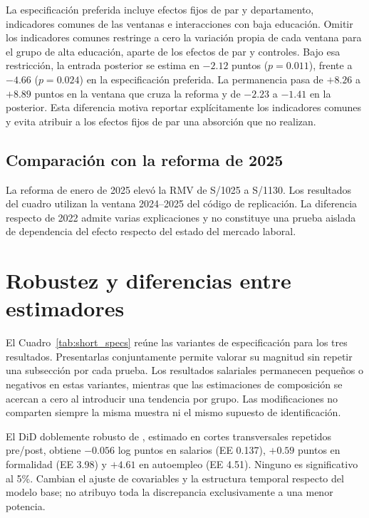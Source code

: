 La especificación preferida incluye efectos fijos de par y departamento, indicadores comunes de las ventanas e interacciones con baja educación. Omitir los indicadores comunes restringe a cero la variación propia de cada ventana para el grupo de alta educación, aparte de los efectos de par y controles. Bajo esa restricción, la entrada posterior se estima en $-2.12$ puntos ($p=0.011$), frente a $-4.66$ ($p=0.024$) en la especificación preferida. La permanencia pasa de $+8.26$ a $+8.89$ puntos en la ventana que cruza la reforma y de $-2.23$ a $-1.41$ en la posterior. Esta diferencia motiva reportar explícitamente los indicadores comunes y evita atribuir a los efectos fijos de par una absorción que no realizan.

\subsection{Comparación con la reforma de 2025}


La reforma de enero de 2025 elevó la RMV de S/1025 a S/1130. Los resultados del cuadro utilizan la ventana 2024--2025 del código de replicación. La diferencia respecto de 2022 admite varias explicaciones y no constituye una prueba aislada de dependencia del efecto respecto del estado del mercado laboral.
\FloatBarrier

\section{Robustez y diferencias entre estimadores}
\label{app:short_robustness}

El Cuadro~\ref{tab:short_specs} reúne las variantes de especificación para los tres resultados. Presentarlas conjuntamente permite valorar su magnitud sin repetir una subsección por cada prueba. Los resultados salariales permanecen pequeños o negativos en estas variantes, mientras que las estimaciones de composición se acercan a cero al introducir una tendencia por grupo. Las modificaciones no comparten siempre la misma muestra ni el mismo supuesto de identificación.



El DiD doblemente robusto de \citet{santanna_zhao_2020}, estimado en cortes transversales repetidos pre/post, obtiene $-0.056$ log puntos en salarios (EE 0.137), $+0.59$ puntos en formalidad (EE 3.98) y $+4.61$ en autoempleo (EE 4.51). Ninguno es significativo al 5\%. Cambian el ajuste de covariables y la estructura temporal respecto del modelo base; no atribuyo toda la discrepancia exclusivamente a una menor potencia.

